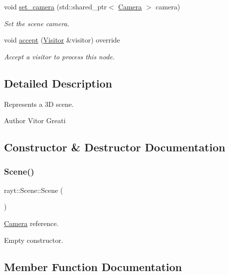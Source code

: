 \begin{DoxyCompactItemize}
void \mbox{\hyperlink{classrayt_1_1_scene_afde427e2d1e5d79942758a2ba91de66f}{set\+\_\+camera}} (std\+::shared\+\_\+ptr$<$ \mbox{\hyperlink{class_camera}{Camera}} $>$ camera)
\begin{DoxyCompactList}\small\item\em Set the scene camera. \end{DoxyCompactList}\item 
void \mbox{\hyperlink{classrayt_1_1_scene_ab39817d306a68ed6b2f7d734c0815f1c}{accept}} (\mbox{\hyperlink{classrayt_1_1_visitor}{Visitor}} \&visitor) override
\begin{DoxyCompactList}\small\item\em Accept a visitor to process this node. \end{DoxyCompactList}\end{DoxyCompactItemize}


\subsection{Detailed Description}
Represents a 3D scene. 

\begin{DoxyAuthor}{Author}
Vitor Greati 
\end{DoxyAuthor}


\subsection{Constructor \& Destructor Documentation}
\mbox{\label{classrayt_1_1_scene_a97534e52f4f218ad80d23babcbc758ad}} 
\subsubsection{\texorpdfstring{Scene()}{Scene()}}
{\footnotesize\ttfamily rayt\+::\+Scene\+::\+Scene (\begin{DoxyParamCaption}{ }\end{DoxyParamCaption})\hspace{0.3cm}{\ttfamily [inline]}}



\mbox{\hyperlink{class_camera}{Camera}} reference. 

Empty constructor. 

\subsection{Member Function Documentation}
\mbox{\label{classrayt_1_1_scene_ab39817d306a68ed6b2f7d734c0815f1c}} 
